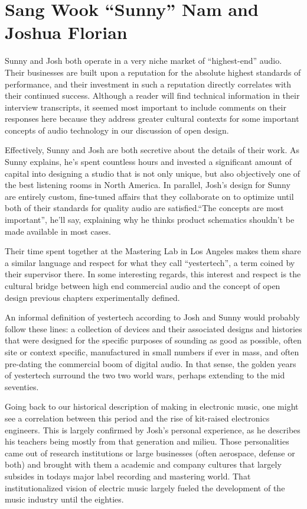 \section{Sang Wook ``Sunny'' Nam and Joshua Florian}

Sunny and Josh both operate in a very niche market of ``highest-end'' audio. Their businesses are built upon a reputation for the absolute highest standards of performance, and their investment in such a reputation directly correlates with their continued success. Although a reader will find technical information in their interview transcripts, it seemed most important to include comments on their responses here because they address greater cultural contexts for some important concepts of audio technology in our discussion of open design. 

Effectively, Sunny and Josh are both secretive about the details of their work. As Sunny explains, he's spent countless hours and invested a significant amount of capital into designing a studio that is not only unique, but also objectively one of the best listening rooms in North America. In parallel, Josh's design for Sunny are entirely custom, fine-tuned affairs that they collaborate on to optimize until both of their standards for quality audio are satisfied.``The concepts are most important'', he'll say, explaining why he thinks product schematics shouldn't be made available in most cases. 

Their time spent together at the Mastering Lab in Los Angeles makes them share a similar language and respect for what they call ``yestertech'', a term coined by their supervisor there. In some interesting regards, this interest and respect is the cultural bridge between high end commercial audio and the concept of open design previous chapters experimentally defined. 

An informal definition of yestertech according to Josh and Sunny would probably follow these lines: a collection of devices and their associated designs and histories that were designed for the specific purposes of sounding as good as possible, often site or context specific, manufactured in small numbers if ever in mass, and often pre-dating the commercial boom of digital audio. In that sense, the golden years of yestertech surround the two two world wars, perhaps extending to the mid seventies. 

Going back to our historical description of making in electronic music, one might see a correlation between this period and the rise of kit-raised electronics engineers. This is largely confirmed by Josh's personal experience, as he describes his teachers being mostly from that generation and milieu. Those personalities came out of research institutions or large businesses (often aerospace, defense or both) and brought with them a academic and company cultures that largely subsides in todays major label recording and mastering world. That institutionalized vision of electric music largely fueled the development of the music industry until the eighties. 

